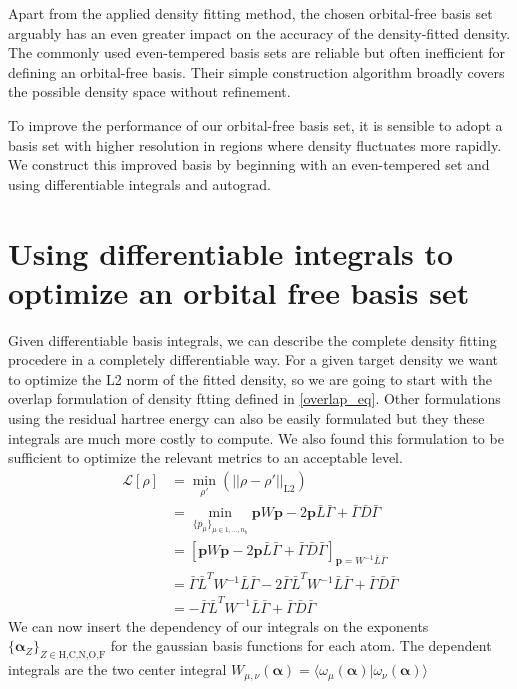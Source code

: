Apart from the applied density fitting method, the chosen orbital-free basis set arguably has an even greater impact on the accuracy of the density-fitted density. The commonly used even-tempered basis sets are reliable but often inefficient for defining an orbital-free basis. Their simple construction algorithm \cite{const} broadly covers the possible density space without refinement.

To improve the performance of our orbital-free basis set, it is sensible to adopt a basis set with higher resolution in regions where density fluctuates more rapidly. We construct this improved basis by beginning with an even-tempered set and using differentiable integrals and autograd.

\section{Using differentiable integrals to optimize an orbital free basis set}
Given differentiable basis integrals, we can describe the complete density fitting procedere in a completely differentiable way. For a given target density we want to optimize the L2 norm of the fitted density, so we are going to start with the overlap formulation of density ftting defined in \eqref{overlap_eq}. Other formulations using the residual hartree energy can also be easily formulated but they these integrals are much more costly to compute. We also found this formulation to be sufficient to optimize the relevant metrics to an acceptable level.
\begin{align}
    \mathcal{L}[\rho] &= \min_{\rho'}\left(||\rho-\rho'||_{\text{L2}}\right)\\
    & = \min_{\{p_{\mu}\}_{\mu \in 1,...,n_b}} \mathbf{p}W \mathbf{p} - 2 \mathbf{p} \bar L \bar\Gamma + \bar\Gamma \bar D \bar\Gamma\\
    & = \left[\mathbf{p} W \mathbf{p} - 2 \mathbf{p} \bar L \bar\Gamma+ \bar\Gamma \bar D \bar\Gamma\right]_{\mathbf{p} = W^{-1}\bar{L}\bar\Gamma}\\
    & = \bar \Gamma \bar L ^T W^{-1} \bar L \bar \Gamma - 2 \bar \Gamma \bar L^T W^{-1} \bar L \bar \Gamma + \bar \Gamma \bar D \bar \Gamma\\
    & = - \bar \Gamma \bar L^T W^{-1} \bar L \bar \Gamma + \bar \Gamma \bar D \bar \Gamma
\end{align}
We can now insert the dependency of our integrals on the exponents $\{\mathbf{\alpha}_Z\}_{Z\in \text{H,C,N,O,F}}$ for the gaussian basis functions for each atom.
The dependent integrals are the two center integral $W_{\mu,\nu}(\mathbf{\alpha}) = \langle \omega_\mu(\mathbf{\alpha})|\omega_\nu(\mathbf{\alpha})\rangle$
